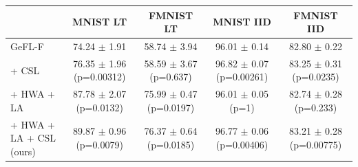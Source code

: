 \begin{tabular}{lcccc}
\toprule
 & MNIST LT & FMNIST LT & MNIST IID & FMNIST IID \\
\midrule
GeFL-F & 74.24 $\pm$ 1.91 & 58.74 $\pm$ 3.94 & 96.01 $\pm$ 0.14 & 82.80 $\pm$ 0.22 \\
+ CSL & 76.35 $\pm$ 1.96 (p=0.00312) & 58.59 $\pm$ 3.67 (p=0.637) & 96.82 $\pm$ 0.07 (p=0.00261) & 83.25 $\pm$ 0.31 (p=0.0235) \\
+ HWA + LA & 87.78 $\pm$ 2.07 (p=0.0132) & 75.99 $\pm$ 0.47 (p=0.0197) & 96.01 $\pm$ 0.05 (p=1) & 82.74 $\pm$ 0.28 (p=0.233) \\
+ HWA + LA + CSL (ours) & 89.87 $\pm$ 0.96 (p=0.0079) & 76.37 $\pm$ 0.64 (p=0.0185) & 96.77 $\pm$ 0.06 (p=0.00406) & 83.21 $\pm$ 0.28 (p=0.00775) \\
\bottomrule
\end{tabular}
